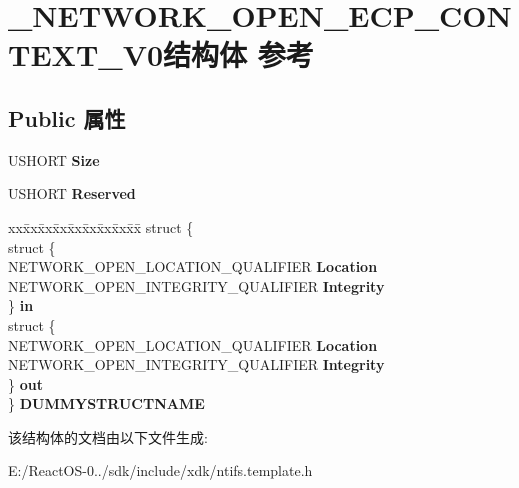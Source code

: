 \hypertarget{struct___n_e_t_w_o_r_k___o_p_e_n___e_c_p___c_o_n_t_e_x_t___v0}{}\section{\+\_\+\+N\+E\+T\+W\+O\+R\+K\+\_\+\+O\+P\+E\+N\+\_\+\+E\+C\+P\+\_\+\+C\+O\+N\+T\+E\+X\+T\+\_\+\+V0结构体 参考}
\label{struct___n_e_t_w_o_r_k___o_p_e_n___e_c_p___c_o_n_t_e_x_t___v0}
\subsection*{Public 属性}
\begin{DoxyCompactItemize}
\item 
\mbox{\label{struct___n_e_t_w_o_r_k___o_p_e_n___e_c_p___c_o_n_t_e_x_t___v0_a0fdc672bc52768b325a47c571992d1b0}} 
U\+S\+H\+O\+RT {\bfseries Size}
\item 
\mbox{\label{struct___n_e_t_w_o_r_k___o_p_e_n___e_c_p___c_o_n_t_e_x_t___v0_ac6523ac764f6fcf1802d10852826d34d}} 
U\+S\+H\+O\+RT {\bfseries Reserved}
\item 
\mbox{\label{struct___n_e_t_w_o_r_k___o_p_e_n___e_c_p___c_o_n_t_e_x_t___v0_ac16a7bf55d620627ed6a14e1ea03f63f}} 
\begin{tabbing}
xx\=xx\=xx\=xx\=xx\=xx\=xx\=xx\=xx\=\kill
struct \{\\
\>struct \{\\
\>\>NETWORK\_OPEN\_LOCATION\_QUALIFIER {\bfseries Location}\\
\>\>NETWORK\_OPEN\_INTEGRITY\_QUALIFIER {\bfseries Integrity}\\
\>\} {\bfseries in}\\
\>struct \{\\
\>\>NETWORK\_OPEN\_LOCATION\_QUALIFIER {\bfseries Location}\\
\>\>NETWORK\_OPEN\_INTEGRITY\_QUALIFIER {\bfseries Integrity}\\
\>\} {\bfseries out}\\
\} {\bfseries DUMMYSTRUCTNAME}\\

\end{tabbing}\end{DoxyCompactItemize}


该结构体的文档由以下文件生成\+:\begin{DoxyCompactItemize}
\item 
E\+:/\+React\+O\+S-\/0../sdk/include/xdk/ntifs.\+template.\+h\end{DoxyCompactItemize}
